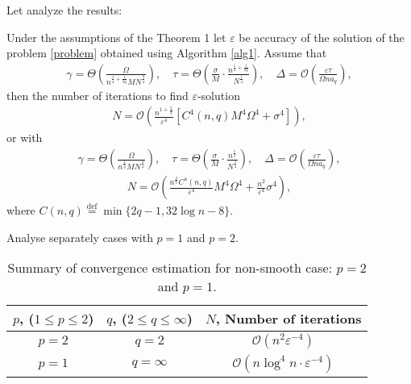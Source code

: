 \documentclass[runningheads]{llncs}
\def\eqdef{\overset{\text{def}}{=}}
\begin{document}
Let analyze the results:
\begin{corollary} Under the assumptions of the Theorem 1 let $\varepsilon$ be accuracy of the solution of the problem \eqref{problem} obtained using Algorithm \ref{alg1}. Assume that
\begin{eqnarray}
    \label{temp1209}
    \gamma = \Theta \left(\frac{\Omega}{n^{\frac{1}{4} + \frac{1}{2q}} M N^{\frac{3}{4}}}\right), \quad \tau = \Theta \left( \frac{\sigma}{M} \cdot \frac{n^{\frac{1}{4} + \frac{1}{2q}}}{N^{\frac{1}{4}}}\right),\quad \Delta = \mathcal{O} \left(\frac{\varepsilon \tau}{\Omega n a_q}\right),
\end{eqnarray}
then the number of iterations to find $\varepsilon$-solution
\begin{eqnarray*}
    N = \mathcal{O} \left( \frac{n^{1 + \frac{2}{q}}}{\varepsilon^4} \left[C^4(n,q) M^4 \Omega^4 +  \sigma^4\right]\right),
\end{eqnarray*}
or with
\begin{eqnarray*}
    \gamma = \Theta \left(\frac{\Omega}{n^{\frac{1}{q}} M N^{\frac{3}{4}}}\right), \quad \tau = \Theta \left( \frac{\sigma}{M} \cdot \frac{n^{\frac{1}{2}}}{N^{\frac{1}{4}}}\right),\quad \Delta = \mathcal{O} \left(\frac{\varepsilon \tau}{\Omega n a_q}\right),
\end{eqnarray*}
\begin{eqnarray*}
    N = \mathcal{O} \left( \frac{n^{\frac{4}{q}} C^4(n,q)}{\varepsilon^4}M^4 \Omega^4 +  \frac{n^{2}}{\varepsilon^4} \sigma^4  \right),
\end{eqnarray*}
where $C(n,q) \eqdef \min\{2q - 1, 32 \log n - 8\}$.
\end{corollary}

Analyse separately cases with $p = 1$ and $p = 2$.
\begin{table}[H]
    \centering
    \begin{tabular}{ |c | c | c |  }
    \hline
    $p$, ($1\leqslant p \leqslant 2$) & $q$,  ($2\leqslant q \leqslant \infty$) &   $N$, Number of iterations\\ \hline
    $p = 2$& $q = 2$ & $\mathcal{O}\left(n^{2} \varepsilon^{-4}\right)$\\\hline
    $p = 1$& $q = \infty$  & $\mathcal{O}\left(n \log^4 n \cdot \varepsilon^{-4}\right)$\\ \hline
\end{tabular}
    \caption{Summary of  convergence estimation for non-smooth case: $p = 2$ and $p = 1$.}
    \label{summary_estim}
\end{table}
\end{document}
